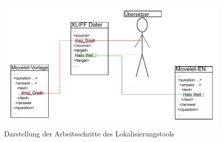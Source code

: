 \begin{figure}
	\centering
	\includegraphics[width=1\textwidth]{img/zusammenfassung.pdf}
	\caption{Darstellung der Arbeitsschritte des Lokalisierungstools}
	\label{fig:zsm}
\end{figure}
